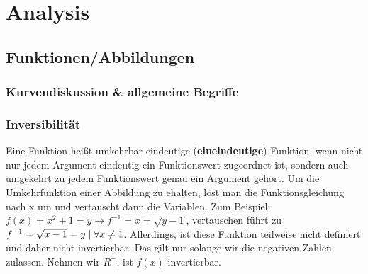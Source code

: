 \documentclass{scrreprt}
\begin{document}
\section{Analysis}\label{Analysis}
%
\subsection{Funktionen/Abbildungen}\label{Funktionen/Abbildungen}
\subsubsection{Kurvendiskussion \& allgemeine Begriffe}\label{Kurvendiskussion und allgemeine Begriffe}
\subsubsection{Inversibilität}\label{Inversibilität}
Eine Funktion heißt umkehrbar eindeutige (\textbf{eineindeutige}) Funktion, wenn nicht nur jedem Argument eindeutig ein Funktionswert zugeordnet ist, sondern auch umgekehrt zu jedem Funktionswert genau ein Argument gehört.
Um die Umkehrfunktion einer Abbildung zu ehalten, löst man die Funktionsgleichung nach x um und vertauscht dann die Variablen.
Zum Beispiel: $f(x)=x^2+1=y \rightarrow f^{-1}=x=\sqrt{y-1}$, vertauschen führt zu $f^{-1}=\sqrt{x-1}=y \hspace{0.1cm} | \hspace{0.1cm} \forall x \neq 1$. Allerdings, ist diese Funktion teilweise nicht definiert und daher nicht invertierbar. Das gilt nur solange wir die negativen Zahlen zulassen. Nehmen wir $\textit{R}^+$, ist $f(x)$ invertierbar.
\end{document}
